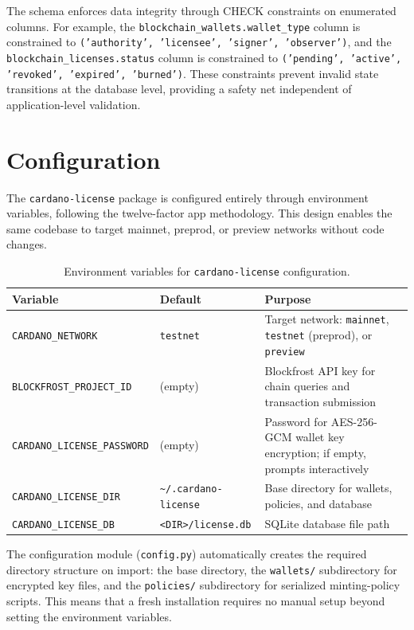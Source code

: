 The schema enforces data integrity through CHECK constraints on enumerated
columns.  For example, the \texttt{blockchain\_wallets.wallet\_type} column
is constrained to \texttt{('authority', 'licensee', 'signer', 'observer')},
and the \texttt{blockchain\_licenses.status} column is constrained to
\texttt{('pending', 'active', 'revoked', 'expired', 'burned')}.  These
constraints prevent invalid state transitions at the database level,
providing a safety net independent of application-level validation.


\section{Configuration}
\label{sec:configuration}

The \texttt{cardano-license} package is configured entirely through
environment variables, following the twelve-factor app methodology.  This
design enables the same codebase to target mainnet, preprod, or preview
networks without code changes.

\begin{table}[htbp]
\centering
\caption{Environment variables for \texttt{cardano-license} configuration.}
\label{tab:env-vars}
\begin{tabular}{@{}p{4.6cm}p{2.8cm}p{5cm}@{}}
\toprule
\textbf{Variable} & \textbf{Default} & \textbf{Purpose} \\
\midrule
\texttt{CARDANO\_NETWORK}
  & \texttt{testnet}
  & Target network: \texttt{mainnet}, \texttt{testnet} (preprod), or \texttt{preview} \\
\addlinespace
\texttt{BLOCKFROST\_PROJECT\_ID}
  & (empty)
  & Blockfrost API key for chain queries and transaction submission \\
\addlinespace
\texttt{CARDANO\_LICENSE\_PASSWORD}
  & (empty)
  & Password for AES-256-GCM wallet key encryption; if empty, prompts interactively \\
\addlinespace
\texttt{CARDANO\_LICENSE\_DIR}
  & \texttt{\textasciitilde/.cardano-license}
  & Base directory for wallets, policies, and database \\
\addlinespace
\texttt{CARDANO\_LICENSE\_DB}
  & \texttt{<DIR>/license.db}
  & SQLite database file path \\
\bottomrule
\end{tabular}
\end{table}

The configuration module (\texttt{config.py}) automatically creates the
required directory structure on import: the base directory, the
\texttt{wallets/} subdirectory for encrypted key files, and the
\texttt{policies/} subdirectory for serialized minting-policy scripts.  This
means that a fresh installation requires no manual setup beyond setting the
environment variables.

